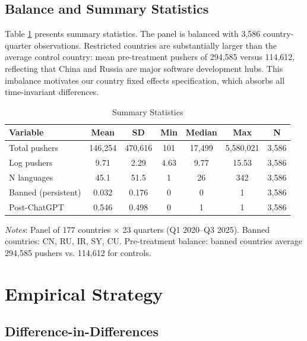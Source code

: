 \documentclass[12pt]{article}
\begin{document}
\subsection{Balance and Summary Statistics}

Table \ref{tab:summary} presents summary statistics. The panel is balanced with 3,586 country-quarter observations. Restricted countries are substantially larger than the average control country: mean pre-treatment pushers of 294,585 versus 114,612, reflecting that China and Russia are major software development hubs. This imbalance motivates our country fixed effects specification, which absorbs all time-invariant differences.

\begin{table}[H]
\centering
\begin{threeparttable}
\caption{Summary Statistics}
\label{tab:summary}
\small
\begin{tabular}{lcccccc}
\toprule
Variable & Mean & SD & Min & Median & Max & N \\
\midrule
Total pushers & 146,254 & 470,616 & 101 & 17,499 & 5,580,021 & 3,586 \\
Log pushers & 9.71 & 2.29 & 4.63 & 9.77 & 15.53 & 3,586 \\
N languages & 45.1 & 51.5 & 1 & 26 & 342 & 3,586 \\
Banned (persistent) & 0.032 & 0.176 & 0 & 0 & 1 & 3,586 \\
Post-ChatGPT & 0.546 & 0.498 & 0 & 1 & 1 & 3,586 \\
\bottomrule
\end{tabular}
\begin{tablenotes}
\small
\item \textit{Notes}: Panel of 177 countries $\times$ 23 quarters (Q1 2020--Q3 2025). Banned countries: CN, RU, IR, SY, CU. Pre-treatment balance: banned countries average 294,585 pushers vs. 114,612 for controls.
\end{tablenotes}
\end{threeparttable}
\end{table}

\section{Empirical Strategy}

\subsection{Difference-in-Differences}
\end{document}
